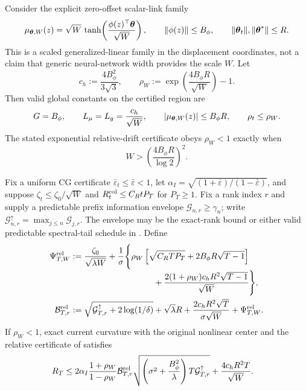 \begin{corollary}
\label{cor:scaled-tanh-relative}
Consider the explicit zero-offset scalar-link family
\begin{equation}\label{eq:scaled-tanh-model}
 \mu_{\boldsymbol{\theta},W}(z)=\sqrt W\,
 \tanh\!\left(\frac{\phi(z)^\top\boldsymbol{\theta}}{\sqrt W}\right),
 \qquad \|\phi(z)\|\le B_\phi,\qquad
 \|\boldsymbol{\theta}_t\|,\|\boldsymbol{\theta}^*\|\le R.
\end{equation}
This is a scaled generalized-linear family in the displacement coordinates,
not a claim that generic neural-network width provides the scale $W$.
Let
\[
 c_h:=\frac{4B_\phi^2}{3\sqrt3},\qquad
 \rho_W:=\exp\!\left(\frac{4B_\phi R}{\sqrt W}\right)-1.
\]
Then valid global constants on the certified region are
\begin{equation}\label{eq:scaled-tanh-constants}
 G=B_\phi,\qquad L_\mu=L_g=\frac{c_h}{\sqrt W},\qquad
 |\mu_{\boldsymbol{\theta},W}(z)|\le B_\phi R,\qquad \rho_t\le\rho_W.
\end{equation}
The stated exponential relative-drift certificate obeys $\rho_W<1$ exactly
when
\begin{equation}\label{eq:scaled-tanh-rho-threshold}
 W>\left(\frac{4B_\phi R}{\log2}\right)^2.
\end{equation}

Fix a uniform CG certificate
$\bar\varepsilon_t\le\bar\varepsilon<1$, let
$\alpha_I=\sqrt{(1+\bar\varepsilon)/(1-\bar\varepsilon)}$, and suppose
$\zeta_t\le\zeta_0/\sqrt W$ and
$R_t^{\rm col}\le C_RtP_T$ for $P_T\ge1$.  Fix a rank index $r$ and supply a
predictable prefix information envelope $\mathcal G_{n,r}\ge\gamma_n$; write
$\mathcal G^\uparrow_{n,r}=\max_{j\le n}\mathcal G_{j,r}$.  The envelope may
be the exact-rank bound or either valid predictable spectral-tail schedule in
.  Define
\begin{align}
 \Psi^{\rm rel}_{T,W}:={}&\frac{\zeta_0}{\sqrt{\lambda W}}
 +\frac1\sigma\Biggl\{\rho_W
 \left[\sqrt{C_RTP_T}+2B_\phi R\sqrt{T-1}\right]
 \nonumber\\[-1mm]
 &\hspace{29mm}
 +\frac{2(1+\rho_W)c_hR^2\sqrt{T-1}}{\sqrt W}\Biggr\},
 \label{eq:scaled-tanh-relative-psi}\\
 \mathcal B^{\rm rel}_{T,r}:={}&
 \sqrt{\mathcal G^\uparrow_{T,r}+2\log(1/\delta)}+\sqrt\lambda R
 +\frac{2c_hR^2\sqrt T}{\sigma\sqrt W}
 +\Psi^{\rm rel}_{T,W}.
 \label{eq:scaled-tanh-relative-radius}
\end{align}
If $\rho_W<1$, exact current curvature with the original nonlinear center and
the relative certificate of  satisfies
\begin{equation}\label{eq:scaled-tanh-relative-regret}
\begin{aligned}
 R_T\le{}&2\alpha_I\frac{1+\rho_W}{1-\rho_W}
 \mathcal B^{\rm rel}_{T,r}
 \sqrt{\left(\sigma^2+\frac{B_\phi^2}{\lambda}\right)
 T\mathcal G^\uparrow_{T,r}}
 +\frac{4c_hR^2T}{\sqrt W}.
\end{aligned}
\end{equation}


\end{corollary}
